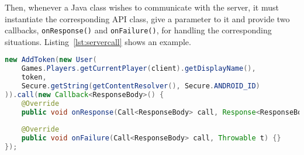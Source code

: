 Then, whenever a Java class wishes to communicate with the server, it must 
instantiate the corresponding API class, give a parameter to it and provide
two callbacks, \texttt{onResponse()} and \texttt{onFailure()}, for handling the
corresponding situations. Listing~\ref{lst:servercall} shows an example.

\begin{lstlisting}[language=Java, caption={Server call example}, label={lst:servercall}]
new AddToken(new User(
	Games.Players.getCurrentPlayer(client).getDisplayName(),
	token,
	Secure.getString(getContentResolver(), Secure.ANDROID_ID)
)).call(new Callback<ResponseBody>() {
	@Override
	public void onResponse(Call<ResponseBody> call, Response<ResponseBody> response) {}
	
	@Override
	public void onFailure(Call<ResponseBody> call, Throwable t) {}
});
\end{lstlisting}